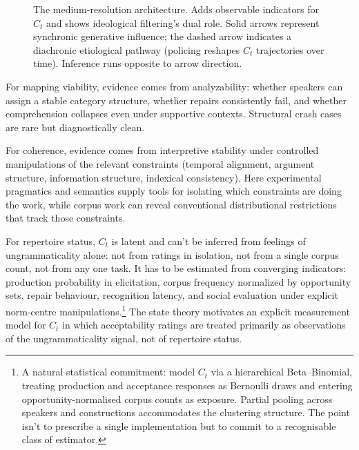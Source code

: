 \documentclass[12pt,letterpaper]{article}
\begin{document}
\begin{figure}[t]
\caption{The medium-resolution architecture. Adds observable indicators for $C_t$ and shows ideological filtering's dual role. Solid arrows represent synchronic generative influence; the dashed arrow indicates a diachronic etiological pathway (policing reshapes $C_t$ trajectories over time). Inference runs opposite to arrow direction.}
\label{fig:medium}
\end{figure}

For mapping viability, evidence comes from analyzability: whether speakers can assign a stable category structure, whether repairs consistently fail, and whether comprehension collapses even under supportive contexts. Structural crash cases are rare but diagnostically clean.

For coherence, evidence comes from interpretive stability under controlled manipulations of the relevant constraints (temporal alignment, argument structure, information structure, indexical consistency). Here experimental pragmatics and semantics supply tools for isolating which constraints are doing the work, while corpus work can reveal conventional distributional restrictions that track those constraints.

For repertoire status, $C_t$ is latent and can't be inferred from feelings of ungrammaticality alone: not from ratings in isolation, not from a single corpus count, not from any one task. It has to be estimated from converging indicators: production probability in elicitation, corpus frequency normalized by opportunity sets, repair behaviour, recognition latency, and social evaluation under explicit norm-centre manipulations.\footnote{A natural statistical commitment: model $C_t$ via a hierarchical Beta--Binomial, treating production and acceptance responses as Bernoulli draws and entering opportunity-normalised corpus counts as exposure. Partial pooling across speakers and constructions accommodates the clustering structure. The point isn't to prescribe a single implementation but to commit to a recognisable class of estimator.} The state theory motivates an explicit measurement model for $C_t$ in which acceptability ratings are treated primarily as observations of the ungrammaticality signal, not of repertoire status.
\end{document}
